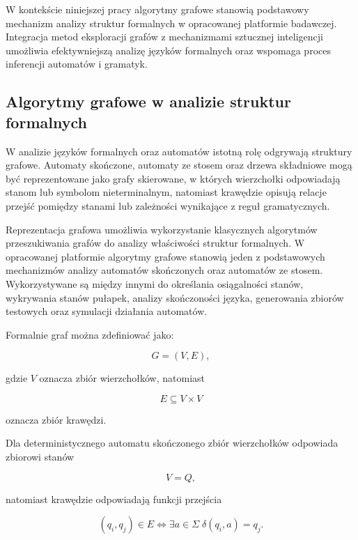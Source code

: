 \documentclass[12pt]{article}
\begin{document}
W kontekście niniejszej pracy algorytmy grafowe stanowią podstawowy mechanizm analizy struktur formalnych w opracowanej platformie badawczej. Integracja metod eksploracji grafów z mechanizmami sztucznej inteligencji umożliwia efektywniejszą analizę języków formalnych oraz wspomaga proces inferencji automatów i gramatyk.

\subsection{Algorytmy grafowe w analizie struktur formalnych}

W analizie języków formalnych oraz automatów istotną rolę odgrywają struktury grafowe. Automaty skończone, automaty ze stosem oraz drzewa składniowe mogą być reprezentowane jako grafy skierowane, w których wierzchołki odpowiadają stanom lub symbolom nieterminalnym, natomiast krawędzie opisują relacje przejść pomiędzy stanami lub zależności wynikające z reguł gramatycznych.

Reprezentacja grafowa umożliwia wykorzystanie klasycznych algorytmów przeszukiwania grafów do analizy właściwości struktur formalnych. W opracowanej platformie algorytmy grafowe stanowią jeden z podstawowych mechanizmów analizy automatów skończonych oraz automatów ze stosem. Wykorzystywane są między innymi do określania osiągalności stanów, wykrywania stanów pułapek, analizy skończoności języka, generowania zbiorów testowych oraz symulacji działania automatów.

Formalnie graf można zdefiniować jako:

\begin{equation}
G=(V,E),
\end{equation}

gdzie $V$ oznacza zbiór wierzchołków, natomiast

\begin{equation}
E \subseteq V \times V
\end{equation}

oznacza zbiór krawędzi.

Dla deterministycznego automatu skończonego zbiór wierzchołków odpowiada zbiorowi stanów

\begin{equation}
V=Q,
\end{equation}

natomiast krawędzie odpowiadają funkcji przejścia

\begin{equation}
(q_i,q_j)\in E \iff \exists a\in\Sigma \; \delta(q_i,a)=q_j.
\end{equation}
\end{document}
